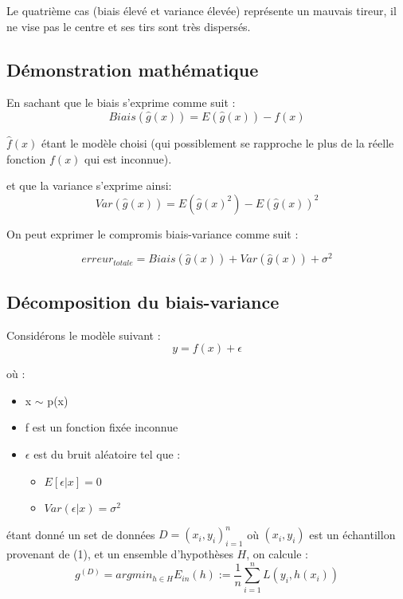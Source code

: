 \documentclass[a4paper]{article}
\begin{document}
Le quatrième cas (biais élevé et variance élevée) représente un mauvais tireur, il ne vise pas le centre et ses tirs sont très dispersés. \par

\newpage

\subsection{Démonstration mathématique}
En sachant que le biais s'exprime comme suit : 
\[ Biais(\hat{g}(x)) = E(\hat{g}(x)) - f(x)\]

 $\hat{f}(x)$ étant le modèle choisi (qui possiblement se rapproche le plus de la réelle fonction $f(x)$ qui est inconnue).
 
 et que la variance s'exprime ainsi: 
 \[ Var(\hat{g}(x)) = E(\hat{g}(x)^2) - E(\hat{g}(x))^2 \]
 
On peut exprimer le compromis biais-variance comme suit : \cite{BiasVarianceTradeoffTextbooksUpdate}

\[ erreur_{totale} = Biais(\hat{g}(x)) + Var(\hat{g}(x)) + \sigma^2 \] 

\newpage

\subsection{Décomposition du biais-variance}
\label{decomposition_Biais_Variance_section}

Considérons le modèle suivant : 
\begin{equation}
\label{decomposition_Biais_Variance}
y = f(x) + \epsilon
\end{equation}

où : 

\begin{itemize}
	\item x $\sim$ p(x)
	\item f est un fonction fixée inconnue
	\item $\epsilon$ est du bruit aléatoire tel que :
	\begin{itemize}
		\item $E[\epsilon|x] = 0$
		\item $Var(\epsilon|x) = \sigma^2$
	\end{itemize}
\end{itemize}


étant donné un set de données $D = {(x_i, y_i)}^n_{i=1}$ où $(x_i, y_i)$ est un échantillon provenant de (1), et un ensemble d'hypothèses $H$, on calcule :
\[ g^{(D)} = argmin_{h\in H}  E_{in}(h) := \frac{1}{n} \sum_{i=1}^{n} L(y_i,h(x_i)) \]
\end{document}
